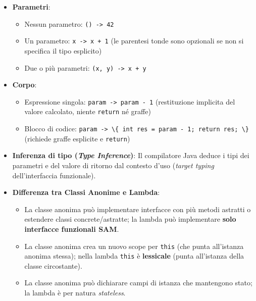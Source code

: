 \documentclass[11pt,a4paper,oneside]{report}
\newcommand{\passthrough}[1]{#1}
\providecommand{\tightlist}{\setlength{\itemsep}{0pt}\setlength{\parskip}{0pt}}
\begin{document}
\begin{itemize}
\tightlist
\item
  \textbf{Parametri}:

  \begin{itemize}
  \tightlist
  \item
    Nessun parametro: \passthrough{\lstinline!() -> 42!}
  \item
    Un parametro: \passthrough{\lstinline!x -> x + 1!} (le parentesi
    tonde sono opzionali se non si specifica il tipo esplicito)
  \item
    Due o più parametri: \passthrough{\lstinline!(x, y) -> x + y!}
  \end{itemize}
\item
  \textbf{Corpo}:

  \begin{itemize}
  \tightlist
  \item
    Espressione singola: \passthrough{\lstinline!param -> param - 1!}
    (restituzione implicita del valore calcolato, niente
    \passthrough{\lstinline!return!} né graffe)
  \item
    Blocco di codice:
    \passthrough{\lstinline!param -> \{ int res = param - 1; return res; \}!}
    (richiede graffe esplicite e \passthrough{\lstinline!return!})
  \end{itemize}
\item
  \textbf{Inferenza di tipo (\emph{Type Inference})}: Il compilatore
  Java deduce i tipi dei parametri e del valore di ritorno dal contesto
  d'uso (\emph{target typing} dell'interfaccia funzionale).
\item
  \textbf{Differenza tra Classi Anonime e Lambda}:

  \begin{itemize}
  \tightlist
  \item
    La classe anonima può implementare interfacce con più metodi
    astratti o estendere classi concrete/astratte; la lambda può
    implementare \textbf{solo interfacce funzionali SAM}.
  \item
    La classe anonima crea un nuovo scope per
    \passthrough{\lstinline!this!} (che punta all'istanza anonima
    stessa); nella lambda \passthrough{\lstinline!this!} è
    \textbf{lessicale} (punta all'istanza della classe circostante).
  \item
    La classe anonima può dichiarare campi di istanza che mantengono
    stato; la lambda è per natura \emph{stateless}.
  \end{itemize}
\end{itemize}
\end{document}
